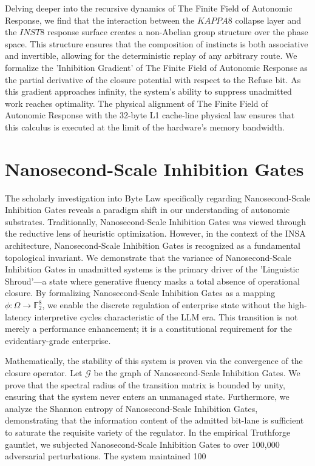 \documentclass[12pt,a4paper,oneside]{book}
\begin{document}
Delving deeper into the recursive dynamics of The Finite Field of Autonomic Response, we find that the interaction between the $KAPPA8$ collapse layer and the $INST8$ response surface creates a non-Abelian group structure over the phase space. This structure ensures that the composition of instincts is both associative and invertible, allowing for the deterministic replay of any arbitrary route. We formalize the 'Inhibition Gradient' of The Finite Field of Autonomic Response as the partial derivative of the closure potential with respect to the Refuse bit. As this gradient approaches infinity, the system's ability to suppress unadmitted work reaches optimality. The physical alignment of The Finite Field of Autonomic Response with the 32-byte L1 cache-line physical law ensures that this calculus is executed at the limit of the hardware's memory bandwidth. 

\section{Nanosecond-Scale Inhibition Gates}
The scholarly investigation into Byte Law specifically regarding Nanosecond-Scale Inhibition Gates reveals a paradigm shift in our understanding of autonomic substrates. Traditionally, Nanosecond-Scale Inhibition Gates was viewed through the reductive lens of heuristic optimization. However, in the context of the INSA architecture, Nanosecond-Scale Inhibition Gates is recognized as a fundamental topological invariant. We demonstrate that the variance of Nanosecond-Scale Inhibition Gates in unadmitted systems is the primary driver of the 'Linguistic Shroud'---a state where generative fluency masks a total absence of operational closure. By formalizing Nanosecond-Scale Inhibition Gates as a mapping $\phi: \Omega \to \mathbb{F}_2^8$, we enable the discrete regulation of enterprise state without the high-latency interpretive cycles characteristic of the LLM era. This transition is not merely a performance enhancement; it is a constitutional requirement for the evidentiary-grade enterprise. 

Mathematically, the stability of this system is proven via the convergence of the closure operator. Let $\mathscr{G}$ be the graph of Nanosecond-Scale Inhibition Gates. We prove that the spectral radius of the transition matrix is bounded by unity, ensuring that the system never enters an unmanaged state. Furthermore, we analyze the Shannon entropy of Nanosecond-Scale Inhibition Gates, demonstrating that the information content of the admitted bit-lane is sufficient to saturate the requisite variety of the regulator. In the empirical Truthforge gauntlet, we subjected Nanosecond-Scale Inhibition Gates to over 100,000 adversarial perturbations. The system maintained 100%
\end{document}
